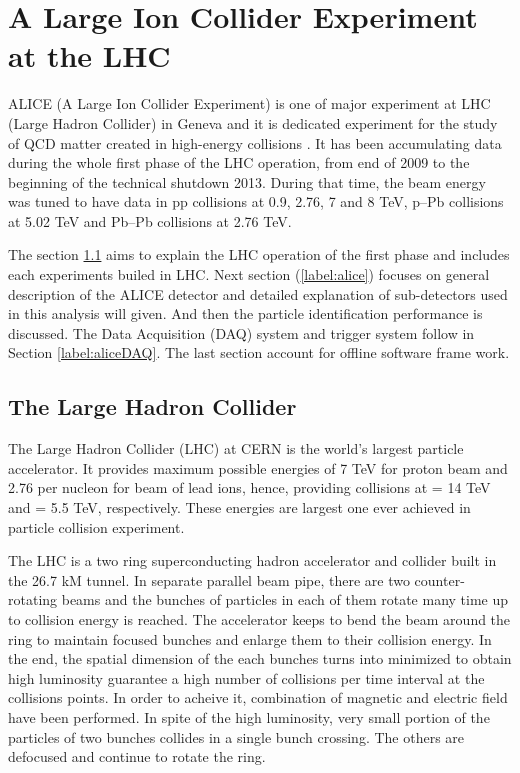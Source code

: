 \newpage
\section{A Large Ion Collider Experiment at the LHC}

ALICE (A Large Ion Collider Experiment) is one of major experiment at LHC (Large Hadron Collider) in Geneva and it is dedicated experiment for the study of QCD matter created in high-energy collisions \cite{cite:ALICEPerformance}. It has been accumulating data during the whole first phase of the LHC operation, from end of 2009 to the beginning of the technical shutdown 2013. During that time, the beam energy was tuned to have data in pp collisions at 0.9, 2.76, 7 and 8 TeV, p--Pb collisions at 5.02 TeV and Pb--Pb collisions at 2.76 TeV.

The section \ref{label:lhc} aims to explain the LHC operation of the first phase and includes each experiments builed in LHC. Next section (\ref{label:alice}) focuses on general description of the ALICE detector and detailed explanation of sub-detectors used in this analysis will given. And then the particle identification performance is discussed. The Data Acquisition (DAQ) system and trigger system follow in Section \ref{label:aliceDAQ}. The last section account for offline software frame work.


\subsection{The Large Hadron Collider}\label{label:lhc}
The Large Hadron Collider (LHC) \cite{cite:LHC} at CERN is the world's largest particle accelerator. It provides maximum possible energies of 7 TeV for proton beam and 2.76 per nucleon for beam of lead ions, hence, providing collisions at \s = 14 TeV and \snn = 5.5 TeV, respectively. These energies are largest one ever achieved in particle collision experiment. 

The LHC is a two ring superconducting hadron accelerator and collider built in the 26.7 kM tunnel. 
In separate parallel beam pipe, there are two counter-rotating beams and the bunches of particles in each of them rotate many time up to collision energy is reached. The accelerator keeps to bend the beam around the ring to maintain focused bunches and enlarge them to their collision energy.
In the end, the spatial dimension of the each bunches turns into minimized to obtain high luminosity guarantee a high number of collisions per time interval at the collisions points. 
In order to acheive it, combination of magnetic and electric field have been performed. In spite of the high luminosity, very small portion of the particles of two bunches collides in a single bunch crossing. The others are defocused and continue to rotate the ring.
   

